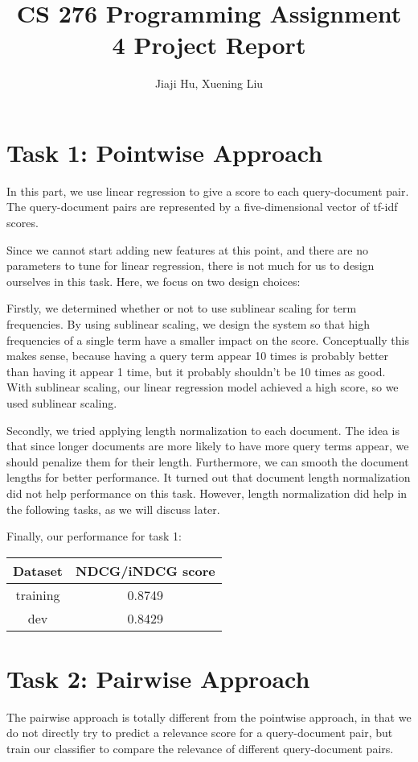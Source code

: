 \documentclass[10pt,twocolumn]{article}
\begin{document}
\title{CS 276 Programming Assignment 4 Project Report}
\author{Jiaji Hu, Xuening Liu}
\date{}
\maketitle

\section*{Task 1: Pointwise Approach}
In this part, we use linear regression to give a score to each query-document pair. The query-document pairs are represented by a five-dimensional vector of tf-idf scores.

Since we cannot start adding new features at this point, and there are no parameters to tune for linear regression, there is not much for us to design ourselves in this task. Here, we focus on two design choices:

Firstly, we determined whether or not to use sublinear scaling for term frequencies. By using sublinear scaling, we design the system so that high frequencies of a single term have a smaller impact on the score. Conceptually this makes sense, because having a query term appear 10 times is probably better than having it appear 1 time, but it probably shouldn't be 10 times as good. With sublinear scaling, our linear regression model achieved a high score, so we used sublinear scaling.

Secondly, we tried applying length normalization to each document. The idea is that since longer documents are more likely to have more query terms appear, we should penalize them for their length. Furthermore, we can smooth the document lengths for better performance. It turned out that document length normalization did not help performance on this task. However, length normalization did help in the following tasks, as we will discuss later.

Finally, our performance for task 1:
\begin{table}[H]
\centering
\begin{tabular}{|c|c|}
\hline
Dataset & NDCG/iNDCG score \\\hline
training & 0.8749\\\hline
dev & 0.8429\\\hline
\end{tabular}
\end{table}

\section*{Task 2: Pairwise Approach}
The pairwise approach is totally different from the pointwise approach, in that we do not directly try to predict a relevance score for a query-document pair, but train our classifier to compare the relevance of different query-document pairs.
\end{document}
